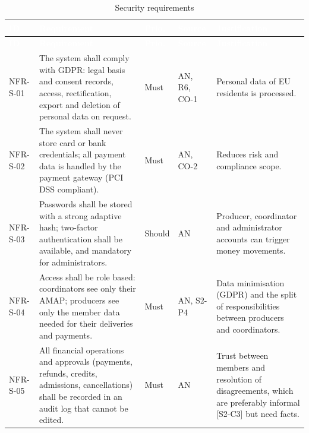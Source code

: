 \documentclass[11pt,a4paper]{article}
\begin{document}
{\footnotesize
\begin{longtable}{>{\raggedright\arraybackslash\hspace{0pt}}p{}>{\raggedright\arraybackslash\hspace{0pt}}p{}>{\raggedright\arraybackslash\hspace{0pt}}p{}>{\raggedright\arraybackslash\hspace{0pt}}p{}>{\raggedright\arraybackslash\hspace{0pt}}p{}}
\caption{Security requirements}\\
\rowcolor{hdr}\textcolor{white}{\textbf{ID}} & \textcolor{white}{\textbf{Requirement}} & \textcolor{white}{\textbf{Prio.}} & \textcolor{white}{\textbf{Source}} & \textcolor{white}{\textbf{Justification}} \\ \endfirsthead
\rowcolor{hdr}\textcolor{white}{\textbf{ID}} & \textcolor{white}{\textbf{Requirement}} & \textcolor{white}{\textbf{Prio.}} & \textcolor{white}{\textbf{Source}} & \textcolor{white}{\textbf{Justification}} \\ \endhead
NFR-S-01 & The system shall comply with GDPR: legal basis and consent records, access, rectification, export and deletion of personal data on request. & Must & AN, R6, CO-1 & Personal data of EU residents is processed. \\ \hline
NFR-S-02 & The system shall never store card or bank credentials; all payment data is handled by the payment gateway (PCI DSS compliant). & Must & AN, CO-2 & Reduces risk and compliance scope. \\ \hline
NFR-S-03 & Passwords shall be stored with a strong adaptive hash; two-factor authentication shall be available, and mandatory for administrators. & Should & AN & Producer, coordinator and administrator accounts can trigger money movements. \\ \hline
NFR-S-04 & Access shall be role based: coordinators see only their AMAP; producers see only the member data needed for their deliveries and payments. & Must & AN, S2-P4 & Data minimisation (GDPR) and the split of responsibilities between producers and coordinators. \\ \hline
NFR-S-05 & All financial operations and approvals (payments, refunds, credits, admissions, cancellations) shall be recorded in an audit log that cannot be edited. & Must & AN & Trust between members and resolution of disagreements, which are preferably informal [S2-C3] but need facts. \\ \hline
\end{longtable}}
\end{document}
